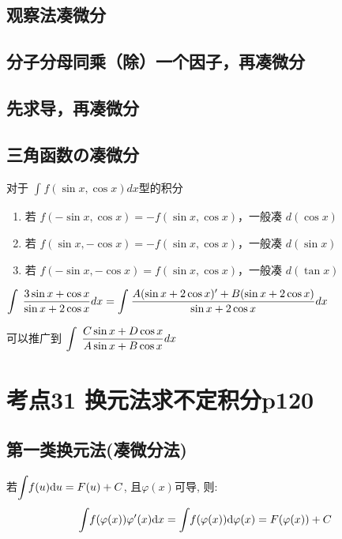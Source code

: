 \subsection{观察法凑微分}

\subsection{分子分母同乘（除）一个因子，再凑微分}

\subsection{先求导，再凑微分}

\subsection{三角函数の凑微分}

\begin{tcolorbox}
    
    对于 $\int_{}^{}f(\sin x,\cos x)dx$型的积分
    
    \begin{enumerate}
        \item 若 $f(-\sin x,\cos x)=-f(\sin x,\cos x)$，一般凑 $d(\cos x)$
        \item 若 $f(\sin x,-\cos x)=-f(\sin x,\cos x)$，一般凑 $d(\sin x)$
        \item 若 $f(-\sin x,-\cos x)=f(\sin x,\cos x)$，一般凑 $d(\tan x)$
    \end{enumerate}
\end{tcolorbox}
    
\begin{tcolorbox}


$\displaystyle\int_{}^{}\hspace{.2em}\frac{3\sin x+\cos x}{\sin x+2\cos x}dx=\int_{}^{}\frac{A(\sin x+2\cos x)'+B(\sin x+2\cos x)}{\sin x+2\cos x}dx$

可以推广到 $\displaystyle\int_{}^{}\hspace{.2em}\frac{C\sin x+D\cos x}{A\sin x+B\cos x}dx$

\end{tcolorbox}

\section{考点31 换元法求不定积分p120}

\subsection{第一类换元法(凑微分法)}
若$ \displaystyle\int_{}\hspace{.2em}f(u)\mathrm{d}u=F(u)+C $, 且$ \varphi(x) $可导, 则:
\begin{equation*}
\displaystyle\int_{}\hspace{.2em}f(\varphi(x))\varphi'(x)\mathrm{d}x=\displaystyle\int_{}\hspace{.2em}f(\varphi(x))\mathrm{d}\varphi(x)=F(\varphi(x))+C
\end{equation*}
